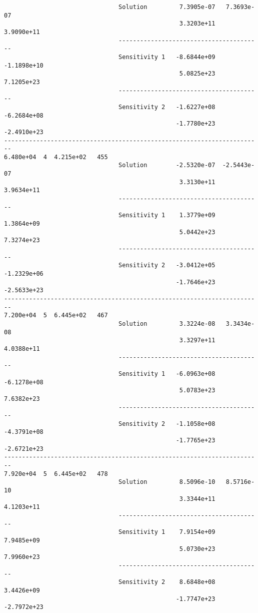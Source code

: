 \begin{verbatim}
                                Solution         7.3905e-07   7.3693e-07 
                                                 3.3203e+11   3.9090e+11 
                                ----------------------------------------
                                Sensitivity 1   -8.6844e+09  -1.1898e+10 
                                                 5.0825e+23   7.1205e+23 
                                ----------------------------------------
                                Sensitivity 2   -1.6227e+08  -6.2684e+08 
                                                -1.7780e+23  -2.4910e+23 
------------------------------------------------------------------------
6.480e+04  4  4.215e+02   455
                                Solution        -2.5320e-07  -2.5443e-07 
                                                 3.3130e+11   3.9634e+11 
                                ----------------------------------------
                                Sensitivity 1    1.3779e+09   1.3864e+09 
                                                 5.0442e+23   7.3274e+23 
                                ----------------------------------------
                                Sensitivity 2   -3.0412e+05  -1.2329e+06 
                                                -1.7646e+23  -2.5633e+23 
------------------------------------------------------------------------
7.200e+04  5  6.445e+02   467
                                Solution         3.3224e-08   3.3434e-08 
                                                 3.3297e+11   4.0388e+11 
                                ----------------------------------------
                                Sensitivity 1   -6.0963e+08  -6.1278e+08 
                                                 5.0783e+23   7.6382e+23 
                                ----------------------------------------
                                Sensitivity 2   -1.1058e+08  -4.3791e+08 
                                                -1.7765e+23  -2.6721e+23 
------------------------------------------------------------------------
7.920e+04  5  6.445e+02   478
                                Solution         8.5096e-10   8.5716e-10 
                                                 3.3344e+11   4.1203e+11 
                                ----------------------------------------
                                Sensitivity 1    7.9154e+09   7.9485e+09 
                                                 5.0730e+23   7.9960e+23 
                                ----------------------------------------
                                Sensitivity 2    8.6848e+08   3.4426e+09 
                                                -1.7747e+23  -2.7972e+23 

\end{verbatim}
